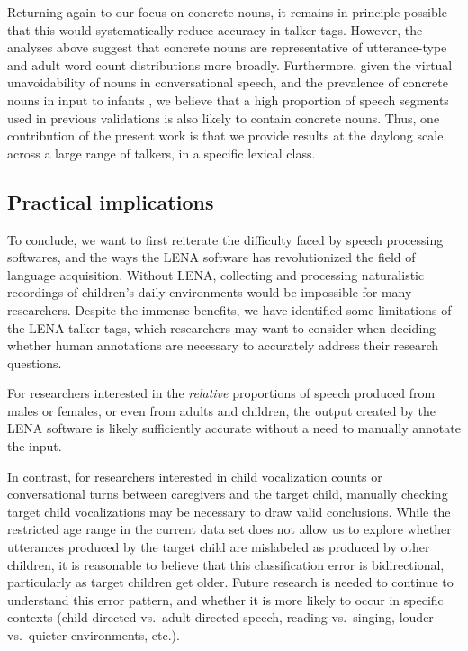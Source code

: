 \documentclass[man,floatsintext]{apa6}
\theoremstyle{definition}
\theoremstyle{definition}
\theoremstyle{definition}
\theoremstyle{remark}
\begin{document}
Returning again to our focus on concrete nouns, it remains in principle
possible that this would systematically reduce accuracy in talker tags.
However, the analyses above suggest that concrete nouns are
representative of utterance-type and adult word count distributions more
broadly. Furthermore, given the virtual unavoidability of nouns in
conversational speech, and the prevalence of concrete nouns in input to
infants \citep{Bergelson2018, Roy2015}, we believe that a high
proportion of speech segments used in previous validations is also
likely to contain concrete nouns. Thus, one contribution of the present
work is that we provide results at the daylong scale, across a large
range of talkers, in a specific lexical class.

\hypertarget{practical-implications}{%
\subsection{Practical implications}\label{practical-implications}}

To conclude, we want to first reiterate the difficulty faced by speech
processing softwares, and the ways the LENA software has revolutionized
the field of language acquisition. Without LENA, collecting and
processing naturalistic recordings of children's daily environments
would be impossible for many researchers. Despite the immense benefits,
we have identified some limitations of the LENA talker tags, which
researchers may want to consider when deciding whether human annotations
are necessary to accurately address their research questions.

For researchers interested in the \emph{relative} proportions of speech
produced from males or females, or even from adults and children, the
output created by the LENA software is likely sufficiently accurate
without a need to manually annotate the input.

In contrast, for researchers interested in child vocalization counts or
conversational turns between caregivers and the target child, manually
checking target child vocalizations may be necessary to draw valid
conclusions. While the restricted age range in the current data set does
not allow us to explore whether utterances produced by the target child
are mislabeled as produced by other children, it is reasonable to
believe that this classification error is bidirectional, particularly as
target children get older. Future research is needed to continue to
understand this error pattern, and whether it is more likely to occur in
specific contexts (child directed vs.~adult directed speech, reading
vs.~singing, louder vs.~quieter environments, etc.).
\end{document}
